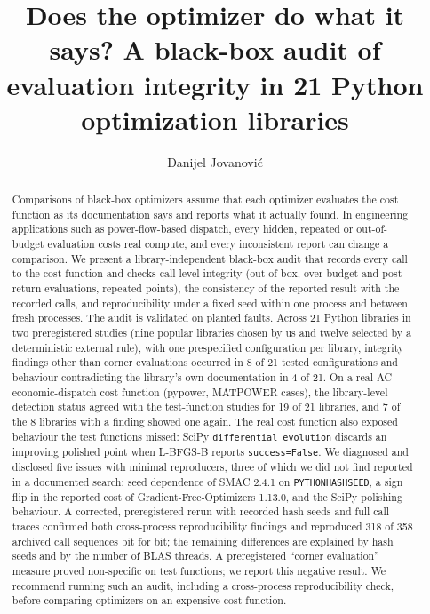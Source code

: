 \documentclass[acmsmall,screen,review,anonymous=false]{acmart}
\begin{document}
\title{Does the optimizer do what it says? A black-box audit of evaluation integrity in 21 Python optimization libraries}
\author{Danijel Jovanovi\'{c}}
\begin{abstract}
Comparisons of black-box optimizers assume that each optimizer evaluates the cost function as its documentation says
and reports what it actually found. In engineering applications such as power-flow-based dispatch, every hidden,
repeated or out-of-budget evaluation costs real compute, and every inconsistent report can change a comparison. We
present a library-independent black-box audit that records every call to the cost function and checks call-level
integrity (out-of-box, over-budget and post-return evaluations, repeated points), the consistency of the reported
result with the recorded calls, and reproducibility under a fixed seed within one process and between fresh
processes. The audit is validated on planted faults. Across 21 Python libraries in two preregistered studies (nine
popular libraries chosen by us and twelve selected by a deterministic external rule), with one prespecified
configuration per library, integrity findings other than corner evaluations occurred in 8 of 21 tested
configurations and behaviour contradicting the library's own documentation in 4 of 21. On a real AC
economic-dispatch cost function (pypower, MATPOWER cases), the library-level detection status agreed with the
test-function studies for 19 of 21 libraries, and 7 of the 8 libraries with a finding showed one again. The real cost
function also exposed behaviour the test functions missed: SciPy \texttt{differential\_\allowbreak{}evolution} discards an improving
polished point when L-BFGS-B reports \texttt{success=False}. We diagnosed and disclosed five issues with minimal
reproducers, three of which we did not find reported in a documented search: seed dependence of SMAC 2.4.1 on
\texttt{PYTHONHASHSEED}, a sign flip in the reported cost of Gradient-Free-Optimizers 1.13.0, and the SciPy polishing
behaviour. A corrected, preregistered rerun with recorded hash seeds and full call traces confirmed both cross-process
reproducibility findings and reproduced 318 of 358 archived call sequences bit for bit; the remaining differences are
explained by hash seeds and by the number of BLAS threads. A preregistered ``corner evaluation'' measure proved
non-specific on test functions; we report this negative result. We recommend running such an audit, including a cross-process reproducibility check, before comparing
optimizers on an expensive cost function.
\end{abstract}
\maketitle
\end{document}
